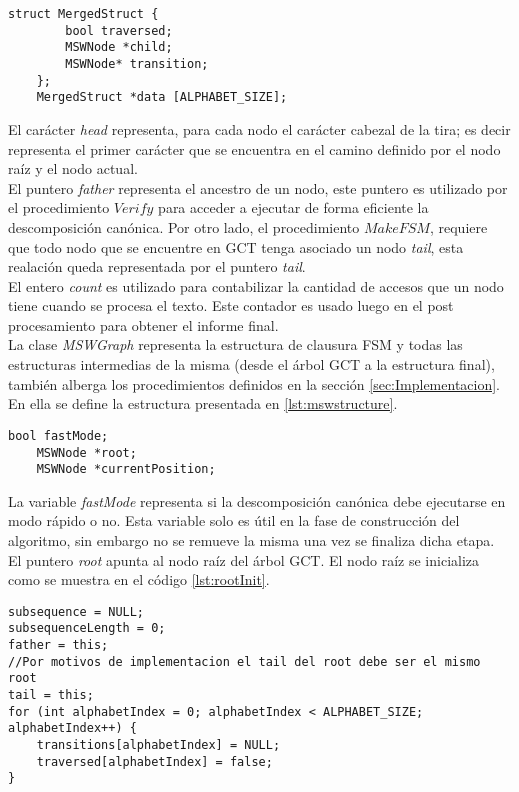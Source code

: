 \begin{lstlisting}[caption=Representación de los nodos en MSW, label={lst:merged_structure}]
   struct MergedStruct {
        bool traversed;
        MSWNode *child;
        MSWNode* transition;
    };
    MergedStruct *data [ALPHABET_SIZE];
\end{lstlisting}
El carácter {\it head} representa, para cada nodo el carácter cabezal de la tira; es decir representa el primer carácter que se encuentra en el camino definido por el nodo raíz y el nodo actual.\\
El puntero {\it father} representa el ancestro de un nodo, este puntero es utilizado por el procedimiento $Verify$ para acceder a ejecutar de forma eficiente la descomposición canónica. Por otro lado, el procedimiento  $MakeFSM$, requiere que todo nodo que se encuentre en GCT tenga asociado un nodo {\it tail}, esta realación queda representada por el puntero {\it tail}.\\
El entero {\it count} es utilizado para contabilizar la cantidad de accesos que un nodo tiene cuando se procesa el texto. Este contador es usado luego en el post procesamiento para obtener el informe final.\\
La clase \emph{MSWGraph} representa la estructura de clausura FSM y todas las estructuras intermedias de la misma (desde el árbol GCT a la estructura final), también alberga los procedimientos definidos en la sección \ref{sec:Implementacion}. En ella se define la estructura presentada en \ref{lst:mswstructure}.
\begin{lstlisting}[caption=Representación de la máquina de estados, label={lst:mswstructure}]
    bool fastMode;
    MSWNode *root;
    MSWNode *currentPosition;
\end{lstlisting}
La variable {\it fastMode} representa si la descomposición canónica debe ejecutarse en modo rápido o no. Esta variable solo es útil en la fase de construcción del algoritmo, sin embargo no se remueve la misma una vez se finaliza dicha etapa. El puntero {\it root} apunta al nodo raíz del árbol GCT. El nodo raíz se inicializa como se muestra en el código \ref{lst:rootInit}. 
\begin{lstlisting}[caption=Inicialización del nodo raíz (realizada en MSWNode), label={lst:rootInit}]
subsequence = NULL;
subsequenceLength = 0;
father = this;
//Por motivos de implementacion el tail del root debe ser el mismo root
tail = this;
for (int alphabetIndex = 0; alphabetIndex < ALPHABET_SIZE; alphabetIndex++) {
	transitions[alphabetIndex] = NULL;
	traversed[alphabetIndex] = false;
}
\end{lstlisting}
